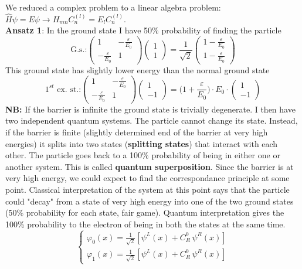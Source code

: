 We reduced a complex problem to a linear algebra problem: $\hat{H}\psi=E\psi \rightarrow H_{mn}C_n^{(l)}=E_lC_n^{(l)}$.\\
\newline
\textbf{Ansatz 1}: In the ground state I have 50\% probability of finding the particle
\[
\text{G.s.:}
\begin{pmatrix}
1 & -\frac{\varepsilon}{E_0}\\
-\frac{\varepsilon}{E_0} & 1
\end{pmatrix}
\begin{pmatrix}
1\\1
\end{pmatrix}
=
\frac{1}{\sqrt{2}}
\begin{pmatrix}
1-\frac{\varepsilon}{E_0}\\1-\frac{\varepsilon}{E_0}
\end{pmatrix}
\]
This ground state has slightly lower energy than the normal ground state
\[
\text{$1^{st}$ ex. st.:}
\begin{pmatrix}
1 & -\frac{\varepsilon}{E_0}\\
-\frac{\varepsilon}{E_0} & 1
\end{pmatrix}
\begin{pmatrix}
1\\-1
\end{pmatrix}
=
\biggl(1+\frac{\varepsilon}{E_0}\biggr)\cdot E_0 \cdot
\begin{pmatrix}
1\\-1
\end{pmatrix}
\]
\textbf{NB:} If the barrier is infinite the ground state is trivially degenerate. I then have two independent quantum systems. The particle cannot change its state. Instead, if the barrier is finite (slightly determined end of the barrier at very high energies) it splits into two states (\textbf{splitting states}) that interact with each other. The particle goes back to a 100\% probability of being in either one or another system. This is called \textbf{quantum superposition}.
\newline
Since the barrier is at very high energy, we could expect to find the correspondance principle at some point. Classical interpretation of the system at this point says that the particle could "decay" from a state of very high energy into one of the two ground states (50\% probability for each state, fair game). Quantum interpretation gives the 100\% probability to the electron of being in both the states at the same time.\\
\[
\begin{cases}
\varphi_0(x) = \frac{1}{\sqrt{2}}[\psi^L(x)+C_R^0\,\psi^R(x)]\\
\varphi_1(x) = \frac{1}{\sqrt{2}}[\psi^L(x)+C_R^0\,\psi^R(x)]
\end{cases}
\]
